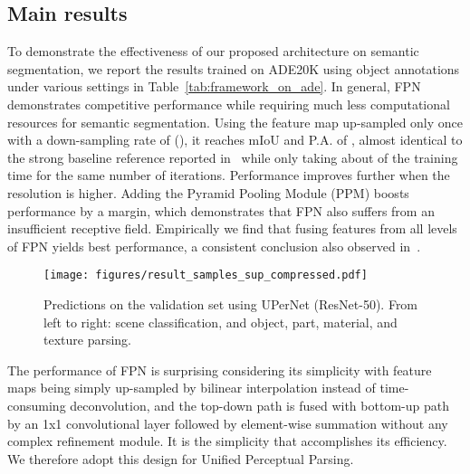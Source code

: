 \documentclass[runningheads]{llncs}
\begin{document}
\subsection{Main results}
\label{sec:results}

 To demonstrate the effectiveness of our proposed architecture on semantic segmentation, we report the results trained on ADE20K using object annotations under various settings in Table~\ref{tab:framework_on_ade}. In general, FPN demonstrates competitive performance while requiring much less computational resources for semantic segmentation. Using the feature map up-sampled only once with a down-sampling rate of  (), it reaches mIoU and P.A. of , almost identical to the strong baseline reference reported in~\cite{zhao2017pyramid} while only taking about  of the training time for the same number of iterations. Performance improves further when the resolution is higher. Adding the Pyramid Pooling Module (PPM) boosts performance by a  margin, which demonstrates that FPN also suffers from an insufficient receptive field. Empirically we find that fusing features from all levels of FPN yields best performance, a consistent conclusion also observed in~\cite{fair2017cocoseg}. 


\begin{figure}[!t]
\centering
\texttt{[image: figures/result\_samples\_sup\_compressed.pdf]}
\caption{Predictions on the validation set using UPerNet (ResNet-50). From left to right: scene classification, and object, part, material, and texture parsing.}
\label{fig:visualization_samples}
\end{figure}

The performance of FPN is surprising considering its simplicity with feature maps being simply up-sampled by bilinear interpolation instead of time-consuming deconvolution, and the top-down path is fused with bottom-up path by an 1x1 convolutional layer followed by element-wise summation without any complex refinement module. It is the simplicity that accomplishes its efficiency. We therefore adopt this design for Unified Perceptual Parsing.
\end{document}
